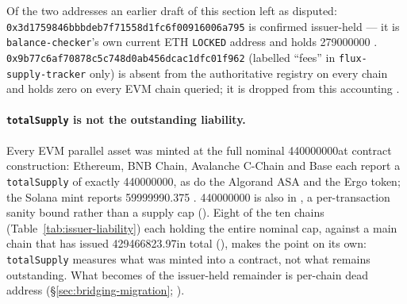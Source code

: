 Of the two addresses an earlier draft of this section left as disputed: \texttt{0x3d1759846bbbde\allowbreak{}b7f71558d1fc6f00\allowbreak{}916006a795}
is confirmed issuer-held --- it is \texttt{balance-\allowbreak{}checker}'s own current ETH \texttt{LOCKED} address
\shipped {} and holds \num{279000000}\flux
\shipped {}.
\texttt{0x9b77c6af70878c\allowbreak{}5c748d0ab456dcac\allowbreak{}1dfc01f962} (labelled ``fees'' in
\texttt{flux-\allowbreak{}supply-\allowbreak{}tracker} only) is absent from the authoritative registry on every chain and
holds zero on every EVM chain queried; it is dropped from this accounting
\shipped {}.

\paragraph{\texttt{totalSupply} is not the outstanding liability.} Every EVM parallel asset was
minted at the full nominal \num{440000000}\flux at contract construction: Ethereum, BNB Chain,
Avalanche C-Chain and Base each report a \texttt{totalSupply} of exactly \num{440000000}\flux, as do
the Algorand ASA and the Ergo token; the Solana mint reports \num{59999990.375}\flux
\shipped {}. \num{440000000} is also
\maxmoney in \fluxd, a per-transaction sanity bound rather than a supply cap
 (). Eight of the ten chains
(Table~\ref{tab:issuer-liability}) each holding
the entire nominal cap, against a main chain that has issued \num{429466823.97}\flux in total
(), makes the point on its own: \texttt{totalSupply} measures what was
minted into a contract, not what remains outstanding. What becomes of the issuer-held remainder is
per-chain dead address (\S\ref{sec:bridging-migration}; \planned
{}).

